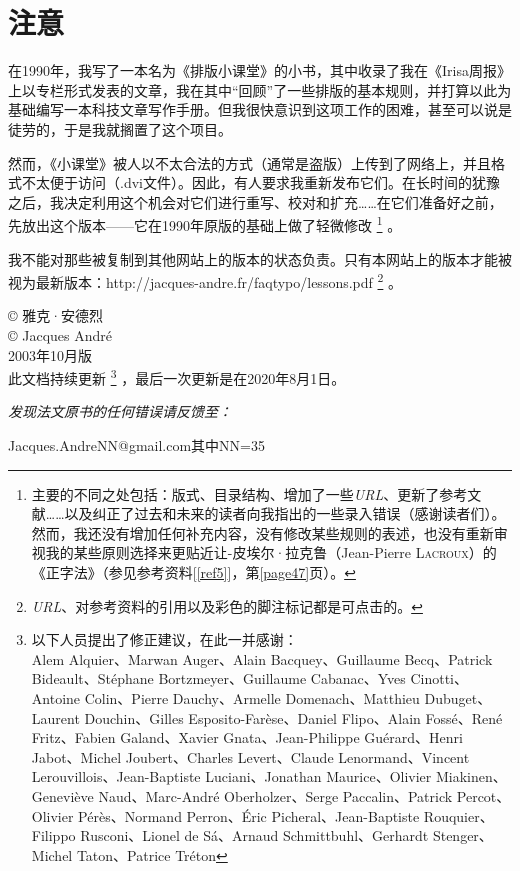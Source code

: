 \chapter*{注\qquad 意}

在1990年，我写了一本名为《排版小课堂》的小书，其中收录了我在《Irisa周报》上以专栏形式发表的文章，我在其中“回顾”了一些排版的基本规则，并打算以此为基础编写一本科技文章写作手册。但我很快意识到这项工作的困难，甚至可以说是徒劳的，于是我就搁置了这个项目。

然而，《小课堂》被人以不太合法的方式（通常是盗版）上传到了网络上，并且格式不太便于访问（.dvi文件）。因此，有人要求我重新发布它们。在长时间的犹豫之后，我决定利用这个机会对它们进行重写、校对和扩充……在它们准备好之前，先放出这个版本——它在1990年原版的基础上做了轻微修改
    \footnote{主要的不同之处包括：版式、目录结构、增加了一些\emph{URL}、更新了参考文献……以及纠正了过去和未来的读者向我指出的一些录入错误（感谢读者们）。然而，我还没有增加任何补充内容，没有修改某些规则的表述，也没有重新审视我的某些原则选择来更贴近让-皮埃尔·拉克鲁（Jean-Pierre \textsc{Lacroux}）的《正字法》（参见参考资料[\ref{ref5}]，第\ref{page47}页）。%
    }
。

我不能对那些被复制到其他网站上的版本的状态负责。只有本网站上的版本才能被视为最新版本：http://jacques-andre.fr/faqtypo/lessons.pdf
    \footnote{\emph{URL}、对参考资料的引用以及彩色的脚注标记都是可点击的。}
。

\begin{flushright}
© 雅克·安德烈\\
© Jacques André\\
2003年10月版\\
此文档持续更新
    \footnote{以下人员提出了修正建议，在此一并感谢：\\
    Alem Alquier、Marwan Auger、Alain Bacquey、Guillaume Becq、Patrick Bideault、Stéphane Bortzmeyer、Guillaume Cabanac、Yves Cinotti、Antoine Colin、Pierre Dauchy、Armelle Domenach、Matthieu Dubuget、Laurent Douchin、Gilles Esposito-Farèse、Daniel Flipo、Alain Fossé、René Fritz、Fabien Galand、Xavier Gnata、Jean-Philippe Guérard、Henri Jabot、Michel Joubert、Charles Levert、Claude Lenormand、Vincent Lerouvillois、Jean-Baptiste Luciani、Jonathan Maurice、Olivier Miakinen、Geneviève Naud、Marc-André Oberholzer、Serge Paccalin、Patrick Percot、Olivier Pérès、Normand Perron、Éric Picheral、Jean-Baptiste Rouquier、Filippo Rusconi、Lionel de Sá、Arnaud Schmittbuhl、Gerhardt Stenger、Michel Taton、Patrice Tréton
    }
，最后一次更新是在2020年8月1日。
\end{flushright}

\vfill
\begin{center}
    \emph{发现法文原书的任何错误请反馈至：
    }

    Jacques.AndreNN@gmail.com\qquad 其中NN=35
\end{center}


